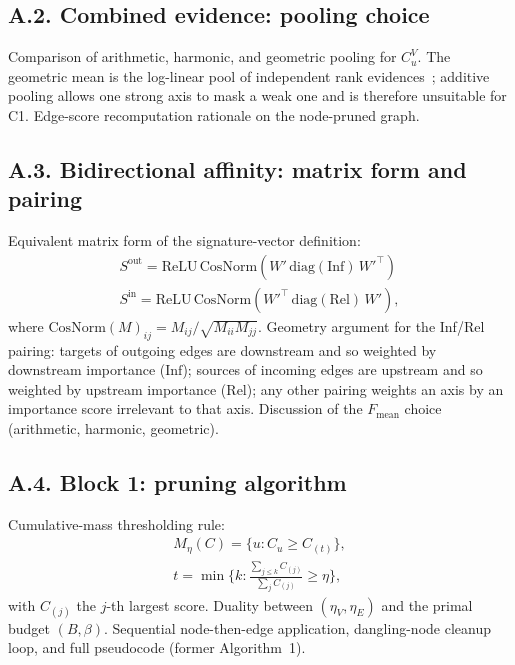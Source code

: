 \documentclass[table, 11pt]{article}
\begin{document}
\subsection*{A.2. Combined evidence: pooling choice}\label{app:pooling}

Comparison of arithmetic, harmonic, and geometric pooling for
$C^V_u$. The geometric mean is the log-linear pool of independent
rank evidences~\cite{genest1986combining}; additive pooling allows
one strong axis to mask a weak one and is therefore unsuitable for
C1. Edge-score recomputation rationale on the node-pruned graph.

\subsection*{A.3. Bidirectional affinity: matrix form and pairing}\label{app:affinity}

Equivalent matrix form of the signature-vector definition:
\begin{align}
S^{\text{out}} = \mathrm{ReLU}\,\mathrm{CosNorm}(W' \,\mathrm{diag}(\text{Inf})\, W'^\top)\\
S^{\text{in}}  = \mathrm{ReLU}\,\mathrm{CosNorm}(W'^\top \,\mathrm{diag}(\text{Rel})\, W'),
\end{align}
where $\mathrm{CosNorm}(M)_{ij} = M_{ij}/\sqrt{M_{ii}M_{jj}}$.
Geometry argument for the Inf/Rel pairing: targets of outgoing edges
are downstream and so weighted by downstream importance ($\text{Inf}$);
sources of incoming edges are upstream and so weighted by upstream
importance ($\text{Rel}$); any other pairing weights an axis by an
importance score irrelevant to that axis. Discussion of the
$F_{\text{mean}}$ choice (arithmetic, harmonic, geometric).

\subsection*{A.4. Block 1: pruning algorithm}\label{app:block1}

Cumulative-mass thresholding rule:
\begin{align}
M_\eta(C) = \{u : C_u \ge C_{(t)}\}, \\
t = \min\{k : \tfrac{\sum_{j \le k} C_{(j)}}{\sum_j C_{(j)}} \ge \eta\},
\end{align}
with $C_{(j)}$ the $j$-th largest score. Duality between
$(\eta_V, \eta_E)$ and the primal budget $(B, \beta)$. Sequential
node-then-edge application, dangling-node cleanup loop, and full
pseudocode (former Algorithm~1).
\end{document}
